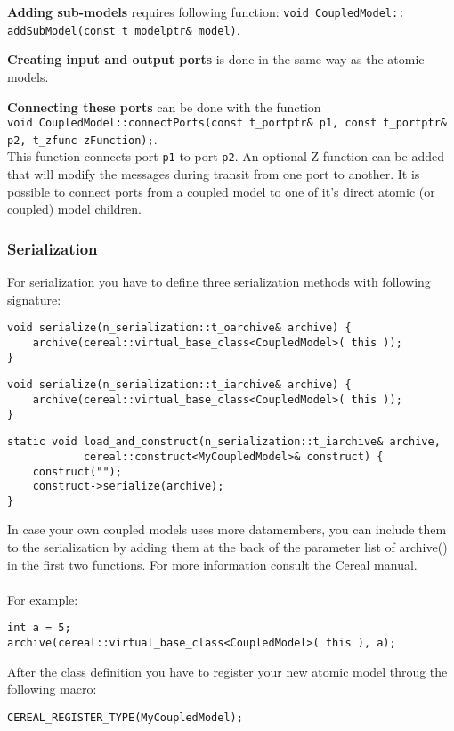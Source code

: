 \textbf{Adding sub-models} requires following function: \texttt{void CoupledModel:: \\addSubModel(const t\_modelptr\& model)}.

\textbf{Creating input and output ports} is done in the same way as the atomic models.

\textbf{Connecting these ports} can be done with the function\\ \texttt{void CoupledModel::connectPorts(const t\_portptr\& p1, const t\_portptr\& p2, t\_zfunc zFunction);}.\\ This function connects port \texttt{p1} to port \texttt{p2}. An optional Z function can be added that will modify the messages during transit from one port to another.
It is possible to connect ports from a coupled model to one of it's direct atomic (or coupled) model children.

\subsubsection{Serialization}
For serialization you have to define three serialization methods with following signature: 
\begin{lstlisting}
void serialize(n_serialization::t_oarchive& archive) {
	archive(cereal::virtual_base_class<CoupledModel>( this ));
}
\end{lstlisting}
\begin{lstlisting}
void serialize(n_serialization::t_iarchive& archive) {
	archive(cereal::virtual_base_class<CoupledModel>( this ));
}
\end{lstlisting}
\begin{lstlisting}
static void load_and_construct(n_serialization::t_iarchive& archive,
			cereal::construct<MyCoupledModel>& construct) {
	construct("");
	construct->serialize(archive);
}
\end{lstlisting}
In case your own coupled models uses more datamembers, you can include them to the serialization by adding them at the back of the parameter list of archive() in the first two functions. For more information consult the Cereal manual.\\
\\ 
For example:
\begin{lstlisting}
int a = 5;
archive(cereal::virtual_base_class<CoupledModel>( this ), a);
\end{lstlisting}
After the class definition you have to register your new atomic model throug the following macro: 
\begin{lstlisting}
CEREAL_REGISTER_TYPE(MyCoupledModel);
\end{lstlisting}

